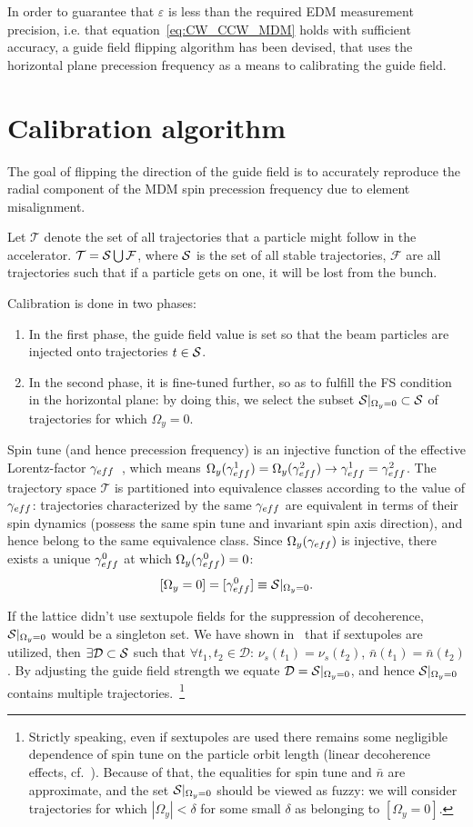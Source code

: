 \documentclass[a4paper]{jacow}
\newcommand{\W}{\Omega}
\newcommand{\Traj}{\mathcal T}
\newcommand{\Fail}{\mathcal F}
\newcommand{\D}{\mathcal D}
\newcommand{\nbar}{\bar n}
\begin{document}
In order to guarantee that $\varepsilon$ is less than the required EDM measurement precision, i.e. that
equation~\eqref{eq:CW_CCW_MDM} holds with sufficient accuracy,
a guide field flipping algorithm has been devised, that uses the horizontal plane precession frequency
as a means to calibrating the guide field. 

\section{Calibration algorithm}
The goal of flipping the direction of the guide field is to accurately reproduce the radial component
of the MDM spin precession frequency due to element misalignment.

Let $\Traj$ denote the set of all trajectories that a particle might follow in the accelerator.
$\Traj = \Stab \bigcup \Fail$, where $\Stab$ is the set of all stable trajectories, $\Fail$ are all trajectories
such that if a particle gets on one, it will be lost from the bunch.

Calibration is done in two phases:
\begin{enumerate}
\item In the first phase, the guide field value is set so that the beam particles are injected onto trajectories
  $t\in\Stab$.
\item In the second phase, it is fine-tuned further, so as to fulfill the FS condition in the horizontal plane:
  by doing this, we select the subset $\Stab*\subset\Stab$ of trajectories for which $\W_y = 0$.
\end{enumerate}

Spin tune (and hence precession frequency) is an injective function of the
effective Lorentz-factor $\g*$~\cite{Aksentev:IPAC19:Decoh}, which means
$\W_y(\g*^1) = \W_y(\g*^2) \rightarrow \g*^1 = \g*^2$. The trajectory space $\Traj$ is partitioned into equivalence
classes according to the value of $\g*$: trajectories characterized by the same $\g*$ are equivalent
in terms of their spin dynamics (possess the same spin tune and invariant spin axis direction),
and hence belong to the same equivalence class.
Since $\W_y(\g*)$ is injective, there exists a unique $\g*^0$ at which $\W_y(\g*^0)=0$:
\[
[\W_y=0] = [\g*^0] \equiv \Stab*.
\]

If the lattice didn't use sextupole fields for the suppression of decoherence,
$\Stab*$ would be a singleton set. We have shown in~\cite{Aksentev:IPAC19:Decoh} that if sextupoles are
utilized, then $\exists\D\subset\Stab$ such that $\forall t_1,t_2\in\D$:
$\nu_s(t_1) = \nu_s(t_2)$, $\nbar(t_1) = \nbar(t_2)$. By adjusting the guide field strength we equate
$\D=\Stab*$, and hence $\Stab*$ contains multiple trajectories.~\footnote{Strictly speaking,
  even if sextupoles are used there remains some negligible dependence of spin tune
  on the particle orbit length (linear decoherence effects, cf.~\cite{Aksentev:IPAC19:Decoh}).
  Because of that, the equalities for spin tune and $\nbar$ are approximate, and the set $\Stab*$
  should be viewed as fuzzy:
  we will consider trajectories for which $|\W_y|<\delta$ for some small $\delta$ as belonging to $[\W_y=0]$.}
\end{document}

